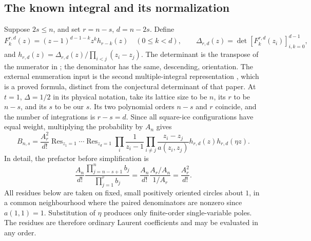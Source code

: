 \documentclass[11pt,a4paper]{amsart}
\theoremstyle{remark}\newtheorem{remark}[theorem]{Remark}
\numberwithin{equation}{section}
\DeclareMathOperator{\Res}{Res}
\begin{document}
\subsection{The known integral and its normalization}
Suppose $2s\le n$, and set $r=n-s$, $d=n-2s$. Define
\[
 F_k^{r,d}(z)=(z-1)^{d-1-k}z^kh_{r-k}(z)\quad(0\le k<d),\qquad
 \Delta_{r,d}(z)=\det[F_k^{r,d}(z_i)]_{i,k=0}^{d-1},
\]
and $h_{r,d}(z)=\Delta_{r,d}(z)/\prod_{i<j}(z_i-z_j)$. The determinant is the transpose of the numerator in \cite[(2.8)]{CP24}; the denominator has the same, descending, orientation.
The external enumeration input is the second multiple-integral representation \cite[(2.9)]{CP24}, which is a proved formula, distinct from the conjectural determinant of that paper. At $t=1$, $\Delta=1/2$ in its physical notation, take its lattice size to be $n$, its $r$ to be $n-s$, and its $s$ to be our $s$. Its two polynomial orders $n-s$ and $r$ coincide, and the number of integrations is $r-s=d$. Since all square-ice configurations have equal weight, multiplying the probability by $A_n$ gives
\begin{equation}\label{eq:true-integral}
 B_{n,s}=\frac{A_r^2}{d!}\Res_{z_1=1}\cdots\Res_{z_d=1}
 \prod_i\frac1{z_i-1}
 \prod_{i\ne j}\frac{z_i-z_j}{a(z_i,z_j)}
 h_{r,d}(z)h_{r,d}(\eta z).
\end{equation}
In detail, the prefactor before simplification is
\[
 \frac{A_n}{d!}\frac{\prod_{j=n-s+1}^n b_j}{\prod_{j=1}^r b_j}
 =\frac{A_n}{d!}\frac{A_r/A_n}{1/A_r}=\frac{A_r^2}{d!}.
\]
All residues below are taken on fixed, small positively oriented circles about $1$, in a common neighbourhood where the paired denominators are nonzero since $a(1,1)=1$. Substitution of $\eta$ produces only finite-order single-variable poles. The residues are therefore ordinary Laurent coefficients and may be evaluated in any order.
\end{document}
